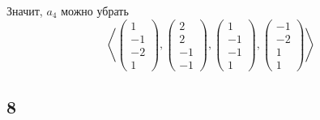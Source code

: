 Значит, $ a_4 $ можно убрать
$$ \left\langle
\begin{pmatrix}
	1 \\
    -1 \\
    -2 \\
    1
\end{pmatrix},
\begin{pmatrix}
	2 \\
    2 \\
    -1 \\
    -1
\end{pmatrix},
\begin{pmatrix}
	1 \\
    -1 \\
    -1 \\
    1
\end{pmatrix},
\begin{pmatrix}
	-1 \\
    -2 \\
    1 \\
    1
\end{pmatrix} \right\rangle $$

\subsection{8}

